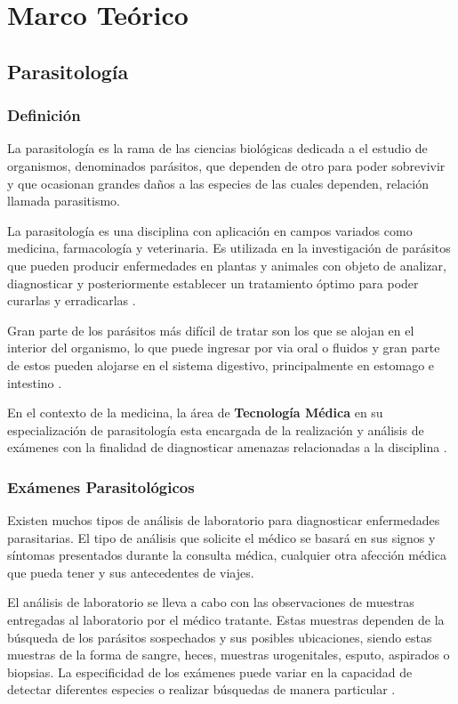 \documentclass[letter,12pt]{report}
\begin{document}
\chapter{Marco Teórico}\label{teorico}

\section{Parasitología}
\subsection{Definición}
La parasitología es la rama de las ciencias biológicas dedicada a el estudio de
organismos, denominados parásitos, que dependen de otro para poder sobrevivir y que
ocasionan grandes daños a las especies de las cuales dependen, relación llamada
parasitismo.

La parasitología es una disciplina con aplicación en campos variados como medicina,
farmacología y veterinaria. Es utilizada en la investigación de parásitos que pueden
producir enfermedades en plantas y animales con objeto de analizar, diagnosticar y
posteriormente establecer un tratamiento óptimo para poder curarlas y
erradicarlas \cite{Paras}.

Gran parte de los parásitos más difícil de tratar son los que se alojan en el
interior del organismo, lo que puede ingresar por via oral o fluidos y gran parte de
estos pueden alojarse en el sistema digestivo, principalmente en estomago e
intestino \cite{Vigil}.

En el contexto de la medicina, la área de \textbf{Tecnología Médica} en su
especialización de parasitología esta encargada de la realización y análisis de
exámenes con la finalidad de diagnosticar amenazas relacionadas a la
disciplina \cite{Digest}.

\subsection{Exámenes Parasitológicos}

Existen muchos tipos de análisis de laboratorio para diagnosticar enfermedades parasitarias.
El tipo de análisis que solicite el médico se basará en sus signos y síntomas presentados
durante la consulta médica, cualquier otra afección médica que pueda tener y sus
antecedentes de viajes.

El análisis de laboratorio se lleva a cabo con las observaciones de muestras entregadas
al laboratorio por el médico tratante. Estas muestras dependen de la búsqueda de los
parásitos sospechados y sus posibles ubicaciones, siendo estas muestras de la forma de
sangre, heces, muestras urogenitales, esputo, aspirados o biopsias. La especificidad de
los exámenes puede variar en la capacidad de detectar diferentes especies o realizar
búsquedas de manera particular \cite{Util}.
\end{document}
